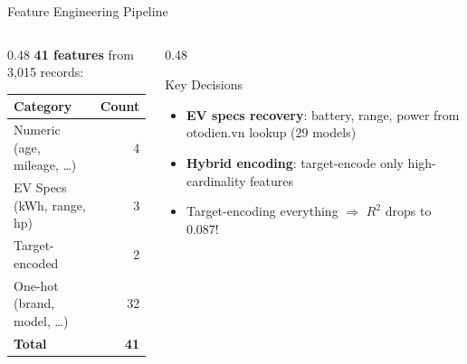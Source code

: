 \documentclass[aspectratio=169]{beamer}
\begin{document}
    \begin{frame}{Feature Engineering Pipeline}
        \begin{columns}[T]
            \begin{column}{0.48\textwidth}
                \textbf{41 features} from 3,015 records:
                \vspace{0.5em}
                \small
                \begin{tabular}{lr}
                    \toprule
                    \textbf{Category}              & \textbf{Count} \\
                    \midrule
                    Numeric (age, mileage, \ldots) & 4              \\
                    EV Specs (kWh, range, hp)      & 3              \\
                    Target-encoded                 & 2              \\
                    One-hot (brand, model, \ldots) & 32             \\
                    \midrule
                    \textbf{Total}                 & \textbf{41}    \\
                    \bottomrule
                \end{tabular}
            \end{column}
            \begin{column}{0.48\textwidth}
                \begin{block}{Key Decisions}
                    \begin{itemize}
                        \small
                        \item \textbf{EV specs recovery}: battery, range, power from otodien.vn lookup (29 models)
                        \item \textbf{Hybrid encoding}: target-encode only high-cardinality features
                        \item Target-encoding everything $\Rightarrow$ $R^2$ drops to 0.087!
                    \end{itemize}
                \end{block}
            \end{column}
        \end{columns}
    \end{frame}
\end{document}
